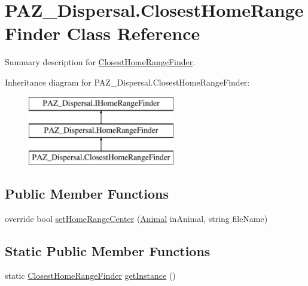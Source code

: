 \hypertarget{class_p_a_z___dispersal_1_1_closest_home_range_finder}{\section{P\-A\-Z\-\_\-\-Dispersal.\-Closest\-Home\-Range\-Finder Class Reference}
\label{class_p_a_z___dispersal_1_1_closest_home_range_finder}
}


Summary description for \hyperlink{class_p_a_z___dispersal_1_1_closest_home_range_finder}{Closest\-Home\-Range\-Finder}.  


Inheritance diagram for P\-A\-Z\-\_\-\-Dispersal.\-Closest\-Home\-Range\-Finder\-:\begin{figure}[H]
\begin{center}
\leavevmode
\includegraphics[height=3.000000cm]{class_p_a_z___dispersal_1_1_closest_home_range_finder}
\end{center}
\end{figure}
\subsection*{Public Member Functions}
\begin{DoxyCompactItemize}
\item 
override bool \hyperlink{class_p_a_z___dispersal_1_1_closest_home_range_finder_a6b1fa55b97bad49a95b859589e87a06e}{set\-Home\-Range\-Center} (\hyperlink{class_p_a_z___dispersal_1_1_animal}{Animal} in\-Animal, string file\-Name)
\end{DoxyCompactItemize}
\subsection*{Static Public Member Functions}
\begin{DoxyCompactItemize}
\item 
static \hyperlink{class_p_a_z___dispersal_1_1_closest_home_range_finder}{Closest\-Home\-Range\-Finder} \hyperlink{class_p_a_z___dispersal_1_1_closest_home_range_finder_a7790c602caca03339f36ab9729a89282}{get\-Instance} ()
\end{DoxyCompactItemize}
